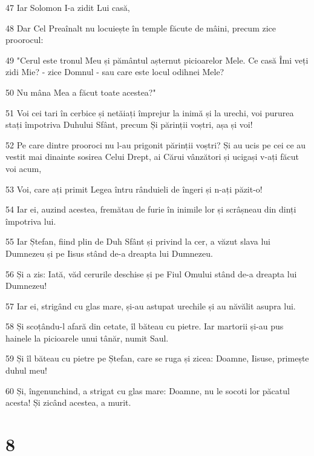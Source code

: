 \par 47 Iar Solomon I-a zidit Lui casă,
\par 48 Dar Cel Preaînalt nu locuiește în temple făcute de mâini, precum zice proorocul:
\par 49 "Cerul este tronul Meu și pământul așternut picioarelor Mele. Ce casă Îmi veți zidi Mie? - zice Domnul - sau care este locul odihnei Mele?
\par 50 Nu mâna Mea a făcut toate acestea?"
\par 51 Voi cei tari în cerbice și netăiați împrejur la inimă și la urechi, voi pururea stați împotriva Duhului Sfânt, precum Și părinții voștri, așa și voi!
\par 52 Pe care dintre prooroci nu l-au prigonit părinții voștri? Și au ucis pe cei ce au vestit mai dinainte sosirea Celui Drept, ai Cărui vânzători și ucigași v-ați făcut voi acum,
\par 53 Voi, care ați primit Legea întru rânduieli de îngeri și n-ați păzit-o!
\par 54 Iar ei, auzind acestea, fremătau de furie în inimile lor și scrâșneau din dinți împotriva lui.
\par 55 Iar Ștefan, fiind plin de Duh Sfânt și privind la cer, a văzut slava lui Dumnezeu și pe Iisus stând de-a dreapta lui Dumnezeu.
\par 56 Și a zis: Iată, văd cerurile deschise și pe Fiul Omului stând de-a dreapta lui Dumnezeu!
\par 57 Iar ei, strigând cu glas mare, și-au astupat urechile și au năvălit asupra lui.
\par 58 Și scoțându-l afară din cetate, îl băteau cu pietre. Iar martorii și-au pus hainele la picioarele unui tânăr, numit Saul.
\par 59 Și îl băteau cu pietre pe Ștefan, care se ruga și zicea: Doamne, Iisuse, primește duhul meu!
\par 60 Și, îngenunchind, a strigat cu glas mare: Doamne, nu le socoti lor păcatul acesta! Și zicând acestea, a murit.

\chapter{8}

